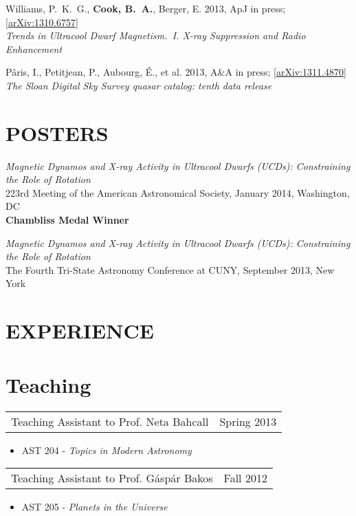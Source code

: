 \documentclass[margin]{res}
\begin{document}
\begin{resume}
Williams, P.~K.~G., \textbf{Cook, B.~A.}, Berger, E. 2013,
ApJ in press; [\href{http://arxiv.org/abs/1310.6757}{arXiv:1310.6757}]\\ \textit{Trends in Ultracool
  Dwarf Magnetism.~I. X-ray Suppression and Radio Enhancement}

P\^{a}ris, I., Petitjean, P., Aubourg, \'E., et al. 2013, A\&A in
press; [\href{http://arxiv.org/abs/1311.4870}{arXiv:1311.4870}]\\ \textit{The Sloan Digital Sky Survey quasar catalog: tenth
  data release}

\section{POSTERS}

\textit{Magnetic Dynamos and X-ray Activity in Ultracool Dwarfs (UCDs):
Constraining the Role of Rotation}\\ 223rd Meeting of the American
Astronomical Society, January 2014, Washington, DC \\
\textbf{Chambliss Medal Winner}

\textit{Magnetic Dynamos and X-ray Activity in Ultracool Dwarfs (UCDs):
Constraining the Role of Rotation}\\ The Fourth Tri-State Astronomy
Conference at CUNY, September 2013, New York

\section{EXPERIENCE}      
\normalsize{\section{Teaching}}
				 \begin{tabular}{@{}p{4in} r}
				 Teaching Assistant to Prof. Neta
                                 Bahcall & Spring 2013
				 \end{tabular}
				 \begin{itemize}
				 \item[] AST 204 - \textit{Topics in
                                   Modern Astronomy}
				 \end{itemize}
				 
				 \begin{tabular}{@{}p{4in} r}
				 Teaching Assistant to
                                 Prof. G\'asp\'ar Bakos & Fall 2012
				 \end{tabular}
				 \begin{itemize}
				 \item[] AST 205 - \textit{Planets in
                                   the Universe}
				 \end{itemize}


\end{resume}
\end{document}

